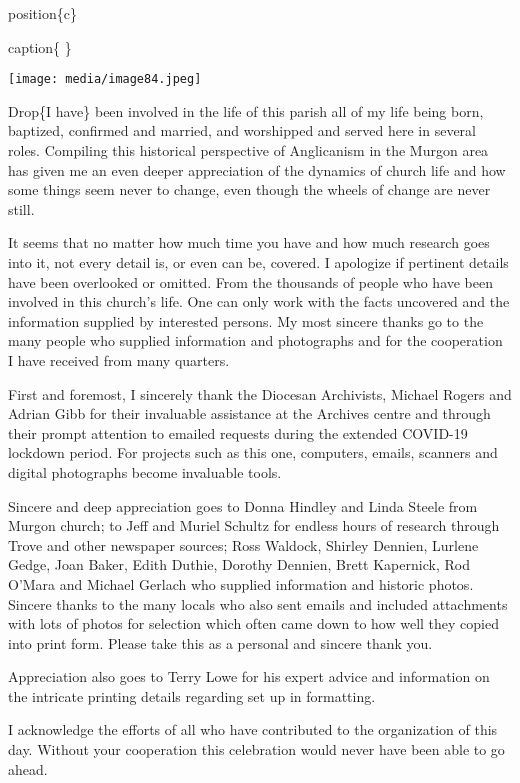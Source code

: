 position\{c\}

caption\{ \}

\texttt{[image: media/image84.jpeg]}

Drop\{I have\} been involved in the life of this parish all of my life being born, baptized, confirmed and married, and worshipped and served here in several roles. Compiling this historical perspective of Anglicanism in the Murgon area has given me an even deeper appreciation of the dynamics of church life and how some things seem never to change, even though the wheels of change are never still.

It seems that no matter how much time you have and how much research goes into it, not every detail is, or even can be, covered. I apologize if pertinent details have been overlooked or omitted. From the thousands of people who have been involved in this church's life. One can only work with the facts uncovered and the information supplied by interested persons. My most sincere thanks go to the many people who supplied information and photographs and for the cooperation I have received from many quarters.

First and foremost, I sincerely thank the Diocesan Archivists, Michael Rogers and Adrian Gibb for their invaluable assistance at the Archives centre and through their prompt attention to emailed requests during the extended COVID-19 lockdown period. For projects such as this one, computers, emails, scanners and digital photographs become invaluable tools.

Sincere and deep appreciation goes to Donna Hindley and Linda Steele from Murgon church; to Jeff and Muriel Schultz for endless hours of research through Trove and other newspaper sources; Ross Waldock, Shirley Dennien, Lurlene Gedge, Joan Baker, Edith Duthie, Dorothy Dennien, Brett Kapernick, Rod O'Mara and Michael Gerlach who supplied information and historic photos. Sincere thanks to the many locals who also sent emails and included attachments with lots of photos for selection which often came down to how well they copied into print form. Please take this as a personal and sincere thank you.

Appreciation also goes to Terry Lowe for his expert advice and information on the intricate printing details regarding set up in formatting.

I acknowledge the efforts of all who have contributed to the organization of this day. Without your cooperation this celebration would never have been able to go ahead.

